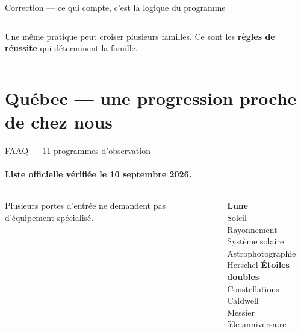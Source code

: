 \documentclass[aspectratio=169]{beamer}
\begin{document}
\begin{frame}{Correction — ce qui compte, c'est la logique du programme}
  \begin{columns}[T,onlytextwidth]
    \vspace{2mm}
    \vspace{2mm}
    \vspace{2mm}
      \vspace{2mm}
      {\small Une même pratique peut croiser plusieurs familles. Ce sont les \textbf{règles de réussite} qui déterminent la famille.}
  \end{columns}
\end{frame}

\section{Québec — une progression proche de chez nous}

\begin{frame}{FAAQ — 11 programmes d'observation}
\framesubtitle{Liste officielle vérifiée le 10 septembre 2026.}
  \begin{columns}[T,onlytextwidth]
      \vspace{3mm}
      {\small\color{SwissMuted}Plusieurs portes d'entrée ne demandent pas d'équipement spécialisé.}
      \begin{columns}[T,onlytextwidth]
        \small
          \textbf{Lune}\\ Soleil\\ Rayonnement\\ Système solaire\\ Astrophotographie\\ Herschel
        \small
          \textbf{Étoiles doubles}\\ Constellations\\ Caldwell\\ Messier\\ 50e anniversaire
      \end{columns}
  \end{columns}
\end{frame}
\end{document}
